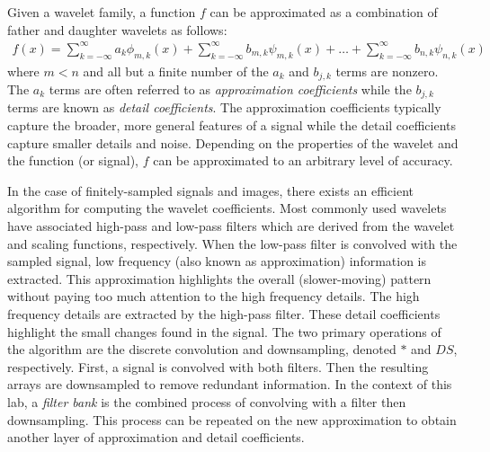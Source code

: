 Given a wavelet family, a function $f$ can be approximated as a combination of father and daughter wavelets as follows:
\begin{align*}
f(x) = \sum_{k=-\infty}^{\infty} a_k\phi_{m,k}(x) + \sum_{k=-\infty}^{\infty} b_{m,k}\psi_{m,k}(x) + \dots + \sum_{k=-\infty}^{\infty} b_{n,k}\psi_{n,k}(x)
\end{align*}
where $m<n$ and all but a finite number of the $a_k$ and $b_{j,k}$ terms are nonzero.
The $a_k$ terms are often referred to as \emph{approximation coefficients} while the $b_{j,k}$ terms are known as \emph{detail coefficients}.
The approximation coefficients typically capture the broader, more general features of a signal while the detail coefficients capture smaller details and noise.
Depending on the properties of the wavelet and the function (or signal), $f$ can be approximated to an arbitrary level of accuracy.

In the case of finitely-sampled signals and images, there exists an efficient algorithm for computing the wavelet coefficients.
Most commonly used wavelets have associated high-pass and low-pass filters which are derived from the wavelet and scaling functions, respectively.
When the low-pass filter is convolved with the sampled signal, low frequency (also known as approximation) information is extracted.
This approximation highlights the overall (slower-moving) pattern without paying too much attention to the high frequency details.%
The high frequency details are extracted by the high-pass filter.
These detail coefficients highlight the small changes found in the signal.
The two primary operations of the algorithm are the discrete convolution and downsampling, denoted $*$ and $DS$, respectively.
First, a signal is convolved with both filters.
Then the resulting arrays are downsampled to remove redundant information.
In the context of this lab, a \emph{filter bank} is the combined process of convolving with a filter then downsampling.
This process can be repeated on the new approximation to obtain another layer of approximation and detail coefficients.

